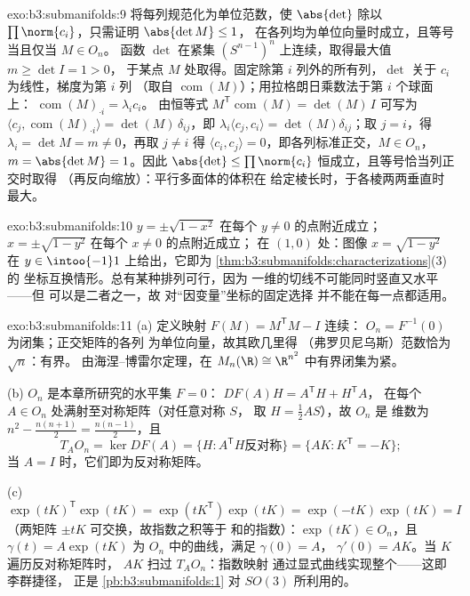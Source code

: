 \begin{solution}{exo:b3:submanifolds:9}
将每列规范化为单位范数，使 $\abs{\det}$ 除以
$\prod\norm{c_i}$，只需证明 $\abs{\det M} \leq 1$，
在各列均为单位向量时成立，且等号当且仅当 $M \in O_n$。
函数 $\det$ 在紧集
$(S^{n-1})^n$ 上连续，取得最大值 $m \geq \det I = 1 > 0$，
于某点 $M$ 处取得。固定除第 $i$ 列外的所有列，$\det$ 关于
$c_i$ 为线性，梯度为第 $i$ 列
（取自 $\operatorname{com}(M)$）；用拉格朗日乘数法于第 $i$ 个球面上：
$\operatorname{com}(M)_{\cdot i} = \lambda_i c_i$。
由恒等式 $M^{\mathsf T}\operatorname{com}(M) = \det(M)\,I$
可写为 $\langle c_j, \operatorname{com}(M)_{\cdot i}\rangle =
\det(M)\,\delta_{ij}$，即 $\lambda_i\langle c_j,
c_i\rangle = \det(M)\delta_{ij}$；取 $j = i$，得 $\lambda_i
= \det M = m \neq 0$，再取 $j \neq i$ 得 $\langle c_i,
c_j\rangle = 0$，即各列标准正交，$M \in O_n$，
$m = \abs{\det M} = 1$。因此 $\abs{\det} \leq
\prod\norm{c_i}$ 恒成立，且等号恰当列正交时取得
（再反向缩放）：平行多面体的体积在
给定棱长时，于各棱两两垂直时最大。
\end{solution}

\begin{solution}{exo:b3:submanifolds:10}
$y = \pm\sqrt{1 - x^2}$ 在每个 $y \neq
0$ 的点附近成立；$x = \pm\sqrt{1 - y^2}$ 在每个 $x \neq 0$ 的点附近成立；
在 $(1, 0)$ 处：图像 $x = \sqrt{1 - y^2}$ 在 $y \in
\intoo{-1}1$ 上给出，它即为
\cref{thm:b3:submanifolds:characterizations}(3) 的
坐标互换情形。总有某种排列可行，因为
一维的切线不可能同时竖直又水平——但
可以是二者之一，故
对“因变量”坐标的固定选择
并不能在每一点都适用。
\end{solution}

\begin{solution}{exo:b3:submanifolds:11}
(a) 定义映射 $F(M) = M^{\mathsf T}M - I$ 连续：
$O_n = F^{-1}(0)$ 为闭集；正交矩阵的各列
为单位向量，故其欧几里得
（弗罗贝尼乌斯）范数恰为 $\sqrt n$：有界。
由海涅–博雷尔定理，在 $M_n(\R) \cong \R^{n^2}$ 中有界闭集为紧。

(b) $O_n$ 是本章所研究的水平集 $F = 0$：
$DF(A)H = A^{\mathsf T}H + H^{\mathsf T}A$，
在每个 $A \in O_n$ 处满射至对称矩阵（对任意对称 $S$，
取 $H = \frac12AS$），故 $O_n$ 是
维数为 $n^2 - \frac{n(n+1)}2 = \frac{n(n-1)}2$，且
\[
T_AO_n = \ker DF(A) = \{H : A^{\mathsf T}H \text{
反对称}\} = \{AK : K^{\mathsf T} = -K\} ;
\]
当 $A = I$ 时，它们即为反对称矩阵。

(c) $\exp(tK)^{\mathsf T}\exp(tK) = \exp(tK^{\mathsf T})
\exp(tK) = \exp(-tK)\exp(tK) = I$（两矩阵 $\pm tK$
可交换，故指数之积等于
和的指数）：$\exp(tK) \in O_n$，且 $\gamma(t) =
A\exp(tK)$ 为 $O_n$ 中的曲线，满足 $\gamma(0) = A$，
$\gamma'(0) = AK$。当 $K$ 遍历反对称矩阵时，
$AK$ 扫过 $T_AO_n$：指数映射
通过显式曲线实现整个——这即李群捷径，
正是 \cref{pb:b3:submanifolds:1} 对 $SO(3)$ 所利用的。
\end{solution}

